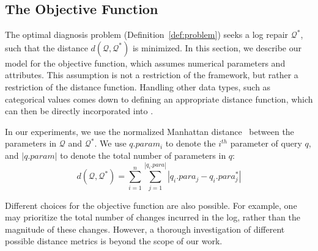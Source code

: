 
\subsection{The Objective Function}

The optimal diagnosis problem (Definition~\ref{def:problem}) seeks a
log repair $\mathcal{Q}^*$, such that the distance
$d(\mathcal{Q},\mathcal{Q}^*)$ is minimized. In this section, we
describe our model for the objective function, which assumes numerical
parameters and attributes. This assumption is not a restriction of the
\sys framework, but rather a restriction of the distance function.
Handling other data types, such as categorical values comes down to defining an appropriate distance function, which can then be directly incorporated into \sys.

In our experiments, we use the normalized Manhattan
distance~\cite{manhattan} between the parameters in $\mathcal{Q}$ and
$\mathcal{Q}^*$. We use $q.param_i$ to denote the $i^{th}$ parameter
of query $q$, and $|q.param|$ to denote the total number of parameters
in $q$: \[d(\mathcal{Q}, \mathcal{Q}^*) = \sum_{i = 1} ^{n} \sum_{j =
1}^{|q_i.para|} |q_i.para_j - q_i.para_j^*|\]

Different choices for the objective function are also possible. For
example, one may prioritize the total number of changes incurred in
the log, rather than the magnitude of these changes. However, a
thorough investigation of different possible distance metrics is
beyond the scope of our work.

